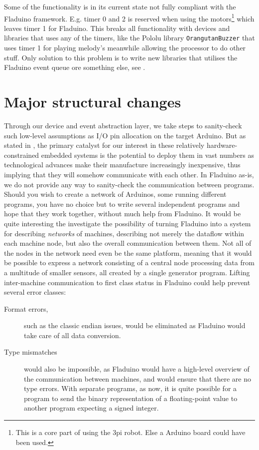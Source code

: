 \documentclass[a4paper, oneside, final]{memoir}
\let\fref\undefined
\let\Fref\undefined
\begin{document}
Some of the functionality is in its current state not fully compliant with the
Fladuino framework. E.g. timer 0 and 2 is reserved when using the
motors\footnote{This is a core part of using the 3pi robot. Else a Arduino board
  could have been used.} which leaves timer 1 for Fladuino. This breaks all
functionality with devices and libraries that uses any of the timers, like the
Pololu library \texttt{OrangutanBuzzer} that uses timer 1 for playing melody's
meanwhile allowing the processor to do other stuff. Only solution to this
problem is to write new libraries that utilises the Fladuino event queue ore
something else, see \fref{sec:fladuino-event-queue}.

\section{Major structural changes}

Through our device and event abstraction layer, we take steps to
sanity-check such low-level assumptions as I/O pin allocation on the
target Arduino.  But as stated in \Fref{sec:motivation}, the primary
catalyst for our interest in these relatively hardware-constrained
embedded systems is the potential to deploy them in vast numbers as
technological advances make their manufacture increasingly
inexpensive, thus implying that they will somehow communicate with
each other.  In Fladuino as-is, we do not provide any way to
sanity-check the communication between programs.  Should you wish to
create a network of Arduinos, some running different programs, you
have no choice but to write several independent programs and hope that
they work together, without much help from Fladuino.  It would be
quite interesting the investigate the possibility of turning Fladuino
into a system for describing \textit{networks} of machines, describing
not merely the dataflow within each machine node, but also the overall
communication between them.  Not all of the nodes in the network need
even be the same platform, meaning that it would be possible to
express a network consisting of a central node processing data from a
multitude of smaller sensors, all created by a single generator
program.  Lifting inter-machine communication to first class status in
Fladuino could help prevent several error classes:

\begin{description}
\item[Format errors,] such as the classic endian issues, would be
  eliminated as Fladuino would take care of all data conversion.
\item[Type mismatches] would also be impossible, as Fladuino would
  have a high-level overview of the communication between machines,
  and would ensure that there are no type errors.  With separate
  programs, as now, it is quite possible for a program to send the
  binary representation of a floating-point value to another program
  expecting a signed integer.
\end{description}
\end{document}
